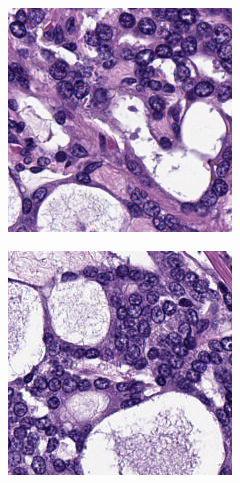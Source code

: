 \begin{figure}[H]
    \centering
    \begin{subfigure}[b]{0.3\textwidth}
        \includegraphics[width=\linewidth]{images/EjemploBiopsia1.png}
    \end{subfigure}
    \hfill
    \begin{subfigure}[b]{0.3\textwidth}
        \includegraphics[width=\linewidth]{images/EjemploBiopsia2.png}

\end{subfigure}
\end{figure}
